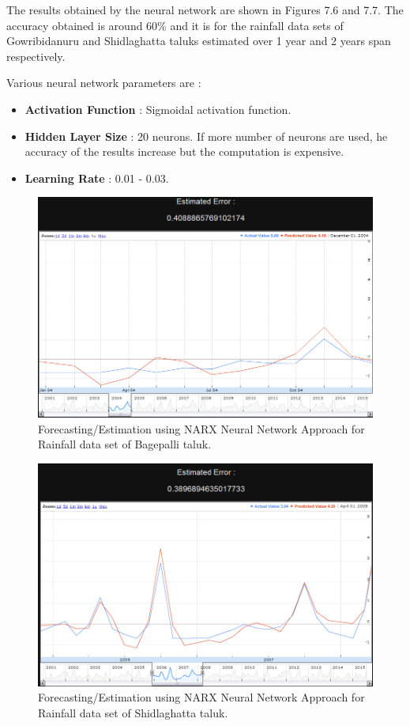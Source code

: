 \documentclass[12pt,a4paper]{report}
\begin{document}
The results obtained by the neural network are shown in Figures 7.6 and 7.7. The accuracy obtained is around 60\% and it is for the rainfall data sets of Gowribidanuru and Shidlaghatta taluks estimated over  1 year and 2 years span respectively.

Various neural network parameters are :
\begin{itemize}
\item \textbf{Activation Function} : Sigmoidal activation function.
\item \textbf{Hidden Layer Size} : 20 neurons. If more number of neurons are used, he accuracy of the results increase but the computation is expensive.
\item \textbf{Learning Rate } : 0.01 - 0.03. 
\end{itemize}

\begin{figure}[h!]

  \centering
    \includegraphics[scale=0.35]{./screenshots/result_fort_NN_Bag.png}
  \caption{Forecasting/Estimation using NARX Neural Network Approach for Rainfall data set of Bagepalli taluk.}
\end{figure}


\begin{figure}[h!]

  \centering
    \includegraphics[scale=0.35]{./screenshots/result_fort_NN_Sid.png}
  \caption{Forecasting/Estimation using NARX Neural Network Approach for Rainfall data set of Shidlaghatta taluk.}
\end{figure}
\end{document}
